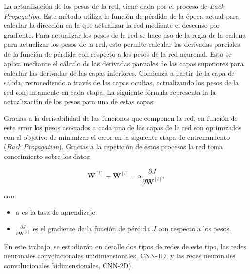 



La actualización de los pesos de la red, viene dada por el proceso de \textit{Back Propagation}. Este método utiliza la función de pérdida de la época actual para calcular la dirección en la que actualizar la red mediante el descenso por gradiente. Para actualizar los pesos de la red se hace uso de la regla de la cadena para actualizar los pesos de la red, esto permite calcular las derivadas parciales de la función de pérdida con respecto a los pesos de la red neuronal. Esto se aplica mediante el cálculo de las derivadas parciales de las capas superiores para calcular las derivadas de las capas inferiores. Comienza a partir de la capa de salida, retrocediendo a través de las capas ocultas, actualizando los pesos de la red conjuntamente en cada etapa. La siguiente fórmula representa la la actualización de los pesos para una de estas capas:


Gracias a la derivabilidad de las funciones que componen la red, en función de este error los pesos asociados a cada una de las capas de la red son optimizados con el objetivo de minimizar el error en la siguiente etapa de entrenamiento (\textit{Back Propagation}). Gracias a la repetición de estos procesos la red toma conocimiento sobre los datos:

\[
\mathbf{W}^{[l]} = \mathbf{W}^{[l]} - \alpha \frac{\partial J}{\partial \mathbf{W}^{[l]}},
\]

con:
\begin{itemize}
	\item \(\alpha\) es la tasa de aprendizaje.
	\item \(\frac{\partial J}{\partial \mathbf{W}^{[l]}}\) es el gradiente de la función de pérdida \(J\) con respecto a los pesos.
\end{itemize}

En este trabajo, se estudiarán en detalle dos tipos de redes de este tipo, las redes neuronales convolucionales unidimensionales, CNN-1D, y las redes neuronales convolucionales bidimensionales, CNN-2D).

